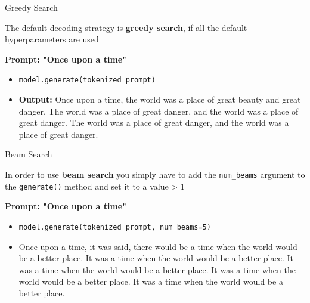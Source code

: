\begin{vbframe}{Greedy Search}

\vfill

The default decoding strategy is \textbf{greedy search}, if all the default hyperparameters are used

\hspace{}

\textbf{Prompt: "Once upon a time"}

\begin{itemize}
    \item \texttt{model.generate(tokenized\_prompt)}
    \item \textbf{Output:} Once upon a time, the world was a place of great beauty and great danger. The world was a place of great danger, and the world was a place of great danger. The world was a place of great danger, and the world was a place of great danger.
\end{itemize}

\vfill
    
\end{vbframe}


\begin{vbframe}{Beam Search}

\vfill

In order to use \textbf{beam search} you simply have to add the \texttt{num\_beams} argument to the \texttt{generate()} method and set it to a value > 1

\hspace{}

\textbf{Prompt: "Once upon a time"}

\begin{itemize}
    \item \texttt{model.generate(tokenized\_prompt, num\_beams=5)}
    \item Once upon a time, it was said, there would be a time when the world would be a better place.
    It was a time when the world would be a better place.
    It was a time when the world would be a better place.
    It was a time when the world would be a better place.
    It was a time when the world would be a better place.
\end{itemize}

\vfill
    
\end{vbframe}



